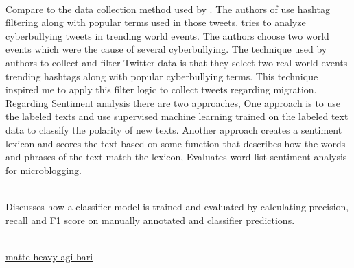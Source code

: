 \\ Compare to the data collection method used by \cite{Hübl}. The authors of \cite{Cortis:2015:ACT:2809563.2809605} use hashtag filtering
along with popular terms used in those tweets. \cite{Cortis:2015:ACT:2809563.2809605} tries to analyze cyberbullying tweets in trending
world events. The authors choose two world events which were the cause of several cyberbullying.
The technique used by authors to collect and filter Twitter data is that they select two real-world
events trending hashtags along with popular cyberbullying terms. This technique inspired me to
apply this filter logic to collect tweets regarding migration.
Regarding Sentiment analysis there are two approaches, One approach is to use the labeled
texts and use supervised machine learning trained on the labeled text data to classify the polarity
of new texts. Another approach creates a sentiment lexicon and scores the text based on some
function that describes how the words and phrases of the text match the lexicon, \cite{DBLP:journals/corr/abs-1103-2903} Evaluates
word list sentiment analysis for microblogging.

\\ \cite{Jamie} Discusses how a classifier model is trained
and evaluated by calculating precision, recall and F1 score on manually annotated and classifier
predictions.


\\ \underline{matte heavy agi bari}
